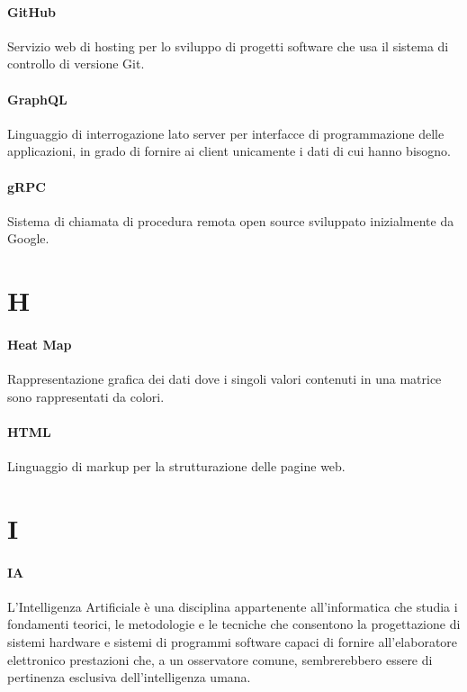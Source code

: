 \documentclass[]{article}
\begin{document}
	\paragraph*{GitHub}
	Servizio web di hosting per lo sviluppo di progetti software che usa il sistema di controllo di versione Git.
	
	\paragraph*{GraphQL}
	Linguaggio di interrogazione lato server per interfacce di programmazione delle applicazioni, in grado di fornire ai client unicamente i dati di cui hanno bisogno.
	
	\paragraph*{gRPC}
	Sistema di chiamata di procedura remota open source sviluppato inizialmente da Google.
	
	\newpage
	
	\section*{H}
	
	\paragraph*{Heat Map}
	Rappresentazione grafica dei dati dove i singoli valori contenuti in una matrice sono rappresentati da colori.
	
	\paragraph*{HTML}
	Linguaggio di markup per la strutturazione delle pagine web.
	
	\newpage
	
	\section*{I}
	
	\paragraph*{IA}
	L'Intelligenza Artificiale è una disciplina appartenente all'informatica che studia i fondamenti teorici, le metodologie e le tecniche che consentono la progettazione di sistemi hardware e sistemi di programmi software capaci di fornire all'elaboratore elettronico prestazioni che, a un osservatore comune, sembrerebbero essere di pertinenza esclusiva dell'intelligenza umana.
	
\end{document}
